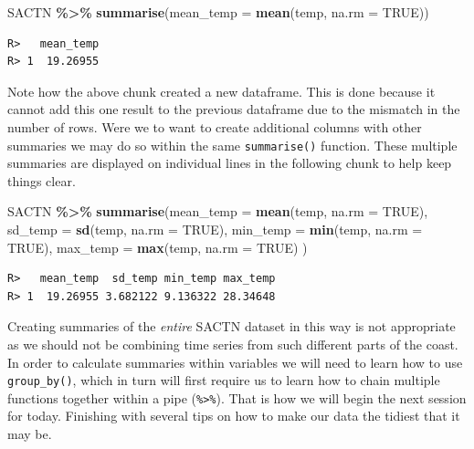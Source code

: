 \documentclass[
]{book}
\newenvironment{Shaded}{\begin{snugshade}}{\end{snugshade}}
\newcommand{\DataTypeTok}[1]{\textcolor[rgb]{0.13,0.29,0.53}{#1}}
\newcommand{\KeywordTok}[1]{\textcolor[rgb]{0.13,0.29,0.53}{\textbf{#1}}}
\newcommand{\NormalTok}[1]{#1}
\newcommand{\OperatorTok}[1]{\textcolor[rgb]{0.81,0.36,0.00}{\textbf{#1}}}
\newcommand{\OtherTok}[1]{\textcolor[rgb]{0.56,0.35,0.01}{#1}}
\newcommand{\StringTok}[1]{\textcolor[rgb]{0.31,0.60,0.02}{#1}}
\begin{document}
\begin{Shaded}
\begin{Highlighting}[]
\NormalTok{SACTN }\OperatorTok{\%>\%}\StringTok{ }
\StringTok{  }\KeywordTok{summarise}\NormalTok{(}\DataTypeTok{mean\_temp =} \KeywordTok{mean}\NormalTok{(temp, }\DataTypeTok{na.rm =} \OtherTok{TRUE}\NormalTok{))}
\end{Highlighting}
\end{Shaded}

\begin{verbatim}
R>   mean_temp
R> 1  19.26955
\end{verbatim}

Note how the above chunk created a new dataframe. This is done because it cannot add this one result to the previous dataframe due to the mismatch in the number of rows. Were we to want to create additional columns with other summaries we may do so within the same \texttt{summarise()} function. These multiple summaries are displayed on individual lines in the following chunk to help keep things clear.

\begin{Shaded}
\begin{Highlighting}[]
\NormalTok{SACTN }\OperatorTok{\%>\%}\StringTok{ }
\StringTok{  }\KeywordTok{summarise}\NormalTok{(}\DataTypeTok{mean\_temp =} \KeywordTok{mean}\NormalTok{(temp, }\DataTypeTok{na.rm =} \OtherTok{TRUE}\NormalTok{),}
            \DataTypeTok{sd\_temp =} \KeywordTok{sd}\NormalTok{(temp, }\DataTypeTok{na.rm =} \OtherTok{TRUE}\NormalTok{),}
            \DataTypeTok{min\_temp =} \KeywordTok{min}\NormalTok{(temp, }\DataTypeTok{na.rm =} \OtherTok{TRUE}\NormalTok{),}
            \DataTypeTok{max\_temp =} \KeywordTok{max}\NormalTok{(temp, }\DataTypeTok{na.rm =} \OtherTok{TRUE}\NormalTok{)}
\NormalTok{            )}
\end{Highlighting}
\end{Shaded}

\begin{verbatim}
R>   mean_temp  sd_temp min_temp max_temp
R> 1  19.26955 3.682122 9.136322 28.34648
\end{verbatim}

Creating summaries of the \emph{entire} SACTN dataset in this way is not appropriate as we should not be combining time series from such different parts of the coast. In order to calculate summaries within variables we will need to learn how to use \texttt{group\_by()}, which in turn will first require us to learn how to chain multiple functions together within a pipe (\texttt{\%\textgreater{}\%}). That is how we will begin the next session for today. Finishing with several tips on how to make our data the tidiest that it may be.
\end{document}
